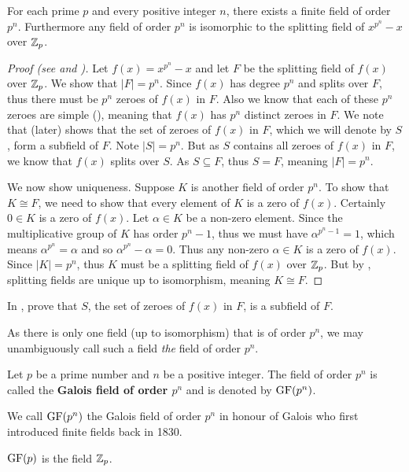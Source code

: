 \begin{theorem}\label{thrm-finite-field-is-unique}
    For each prime $p$ and every positive integer $n$, there exists a finite field of order $p^n$. Furthermore any field of order $p^n$ is isomorphic to the splitting field of $x^{p^n} - x$ over $\mathbb{Z}_p$.
\end{theorem}
\begin{proof}[Proof (see {\cite[Theorem 22.1]{gallian_2016}} and {\cite[Theorem 22.6]{judson_beezer_2022}})]
    Let $f(x) = x^{p^n} - x$ and let $F$ be the splitting field of $f(x)$ over $\mathbb{Z}_p$. We show that $|F| = p^n$. Since $f(x)$ has degree $p^n$ and splits over $F$, thus there must be $p^n$ zeroes of $f(x)$ in $F$. Also we know that each of these $p^n$ zeroes are simple (), meaning that $f(x)$ has $p^n$ distinct zeroes in $F$. We note that  (later) shows that the set of zeroes of $f(x)$ in $F$, which we will denote by $S$, form a subfield of $F$. Note $|S| = p^n$. But as $S$ contains all zeroes of $f(x)$ in $F$, we know that $f(x)$ splits over $S$. As $S \subseteq F$, thus $S = F$, meaning $|F| = p^n$.

    We now show uniqueness. Suppose $K$ is another field of order $p^n$. To show that $K \cong F$, we need to show that every element of $K$ is a zero of $f(x)$. Certainly $0 \in K$ is a zero of $f(x)$. Let $\alpha \in K$ be a non-zero element. Since the multiplicative group of $K$ has order $p^n - 1$, thus we must have $\alpha^{p^n-1} = 1$, which means $\alpha^{p^n} = \alpha$ and so $\alpha^{p^n}-\alpha = 0$. Thus any non-zero $\alpha \in K$ is a zero of $f(x)$. Since $|K| = p^n$, thus $K$ must be a splitting field of $f(x)$ over $\mathbb{Z}_p$. But by , splitting fields are unique up to isomorphism, meaning $K \cong F$.
\end{proof}

\begin{exercise}\label{exercise-zeroes-of-polynomial-form-subfield}
    In , prove that $S$, the set of zeroes of $f(x)$ in $F$, is a subfield of $F$.
\end{exercise}

As there is only one field (up to isomorphism) that is of order $p^n$, we may unambiguously call such a field \textit{the} field of order $p^n$.

\begin{definition}
    Let $p$ be a prime number and $n$ be a positive integer. The field of order $p^n$ is called the \textbf{Galois field of order $p^n$} and is denoted by $\mathrm{GF}(p^n)$.
\end{definition}
\begin{remark}
    We call $\mathrm{GF}(p^n)$ the Galois field of order $p^n$ in honour of Galois who first introduced finite fields back in 1830.
\end{remark}
\begin{remark}
    $\mathrm{GF}(p)$ is the field $\mathbb{Z}_p$.
\end{remark}


